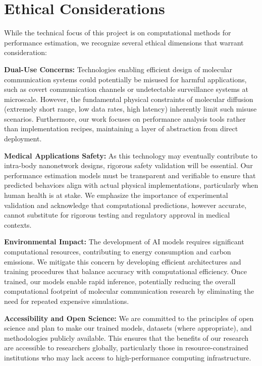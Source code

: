 \documentclass[a4paper,12pt]{report}
\begin{document}
\section{Ethical Considerations}

While the technical focus of this project is on computational methods for performance estimation, we recognize several ethical dimensions that warrant consideration:

\textbf{Dual-Use Concerns:} Technologies enabling efficient design of molecular communication systems could potentially be misused for harmful applications, such as covert communication channels or undetectable surveillance systems at microscale. However, the fundamental physical constraints of molecular diffusion (extremely short range, low data rates, high latency) inherently limit such misuse scenarios. Furthermore, our work focuses on performance analysis tools rather than implementation recipes, maintaining a layer of abstraction from direct deployment.

\textbf{Medical Applications Safety:} As this technology may eventually contribute to intra-body nanonetwork designs, rigorous safety validation will be essential. Our performance estimation models must be transparent and verifiable to ensure that predicted behaviors align with actual physical implementations, particularly when human health is at stake. We emphasize the importance of experimental validation and acknowledge that computational predictions, however accurate, cannot substitute for rigorous testing and regulatory approval in medical contexts.

\textbf{Environmental Impact:} The development of AI models requires significant computational resources, contributing to energy consumption and carbon emissions. We mitigate this concern by developing efficient architectures and training procedures that balance accuracy with computational efficiency. Once trained, our models enable rapid inference, potentially reducing the overall computational footprint of molecular communication research by eliminating the need for repeated expensive simulations.

\textbf{Accessibility and Open Science:} We are committed to the principles of open science and plan to make our trained models, datasets (where appropriate), and methodologies publicly available. This ensures that the benefits of our research are accessible to researchers globally, particularly those in resource-constrained institutions who may lack access to high-performance computing infrastructure.
\end{document}
